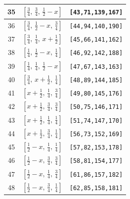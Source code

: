 \documentclass[fleqn,8pt]{jsarticle}
\begin{document}
\begin{longtable}{ccc}
35 & $\left[ \frac{3}{4},\, \frac{3}{4},\, \frac{1}{2} - x \right]$ & {\tt [43,71,139,167]} \\ \hline
36 & $\left[ \frac{3}{4},\, \frac{1}{2} - x,\, \frac{3}{4} \right]$ & {\tt [44,94,140,190]} \\ \hline
37 & $\left[ \frac{3}{4},\, \frac{1}{4},\, x + \frac{1}{2} \right]$ & {\tt [45,66,141,162]} \\ \hline
38 & $\left[ \frac{1}{4},\, \frac{1}{2} - x,\, \frac{1}{4} \right]$ & {\tt [46,92,142,188]} \\ \hline
39 & $\left[ \frac{1}{4},\, \frac{1}{4},\, \frac{1}{2} - x \right]$ & {\tt [47,67,143,163]} \\ \hline
40 & $\left[ \frac{3}{4},\, x + \frac{1}{2},\, \frac{1}{4} \right]$ & {\tt [48,89,144,185]} \\ \hline
41 & $\left[ x + \frac{1}{2},\, \frac{1}{4},\, \frac{3}{4} \right]$ & {\tt [49,80,145,176]} \\ \hline
42 & $\left[ x + \frac{1}{2},\, \frac{3}{4},\, \frac{3}{4} \right]$ & {\tt [50,75,146,171]} \\ \hline
43 & $\left[ x + \frac{1}{2},\, \frac{1}{4},\, \frac{1}{4} \right]$ & {\tt [51,74,147,170]} \\ \hline
44 & $\left[ x + \frac{1}{2},\, \frac{3}{4},\, \frac{1}{4} \right]$ & {\tt [56,73,152,169]} \\ \hline
45 & $\left[ \frac{1}{2} - x,\, \frac{1}{4},\, \frac{1}{4} \right]$ & {\tt [57,82,153,178]} \\ \hline
46 & $\left[ \frac{1}{2} - x,\, \frac{3}{4},\, \frac{3}{4} \right]$ & {\tt [58,81,154,177]} \\ \hline
47 & $\left[ \frac{1}{2} - x,\, \frac{1}{4},\, \frac{3}{4} \right]$ & {\tt [61,86,157,182]} \\ \hline
48 & $\left[ \frac{1}{2} - x,\, \frac{3}{4},\, \frac{1}{4} \right]$ & {\tt [62,85,158,181]} \\
\end{longtable}
\renewcommand{\arraystretch}{1.2}
\end{document}
